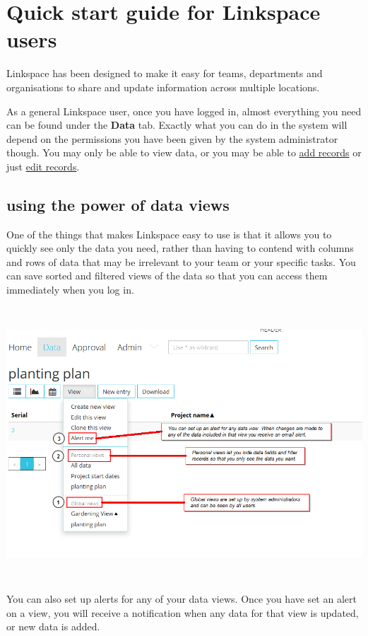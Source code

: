 \documentclass{ctrlo-int-toc}
\begin{document}
\clearpage\section{Quick start guide for Linkspace users}
\label{sec:quickstart}
Linkspace has been designed to make it easy for teams, departments and organisations to share and update information across multiple locations.

As a general Linkspace user, once you have logged in, almost everything you need can be found under the \textbf{Data} tab. Exactly what you can do in the system will depend on the permissions you have been given by the system administrator though. You may only be able to view data, or you may be able to \hyperref[subsec:addrecord]{add records} or just \hyperref[subsec:editrecord]{edit records}.

\subsection{using the power of data views}
One of the things that makes Linkspace easy to use is that it allows you to quickly see only the data you need, rather than having to contend with columns and rows of data that may be irrelevant to your team or your specific tasks. You can save sorted and filtered views of the data so that you can access them immediately when you log in.

\includegraphics[width=15.921cm,height=10.188cm]{userguide-img/userguide-img001.png}


You can also set up alerts for any of your data views. Once you have set an alert on a view, you will receive a notification when any data for that view is updated, or new data is added.
\end{document}
